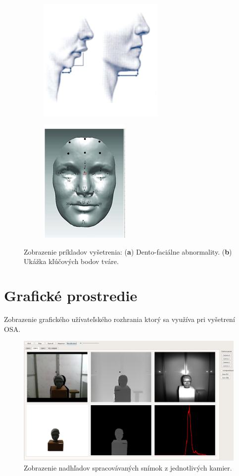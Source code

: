 \begin{figure}[!h]
	\centering
	\begin{subfigure}[b]{0.45\textwidth}
		\centering
		\includegraphics[height=6cm]{figures/dotaznik_3.png}
		\caption{}
		\label{fig:dotaznik:b}
	\end{subfigure}
	\begin{subfigure}[b]{0.45\textwidth}
		\centering
		\includegraphics[height=6cm]{figures/dotaznik_4.png}
		\caption{}
		\label{fig:dotaznik:c}
	\end{subfigure}
	\caption{Zobrazenie príkladov vyšetrenia: (\textbf{a}) Dento-faciálne abnormality. (\textbf{b}) Ukážka kľúčových bodov tváre. }
	\label{fig:dotaznik}
\end{figure}


\newpage
\section{Grafické prostredie} \label{sec:Priloha:HMI}
Zobrazenie grafického užívateľského rozhrania ktorý sa využíva pri vyšetrení OSA.

\begin{figure}[H]
	\centering
	\includegraphics[width=\textwidth]{figures/hmi.png}
	\caption{Zobrazenie nadhľadov spracovávaných snímok z jednotlivých kamier.}
	\label{fig:hmi:a}
\end{figure}

